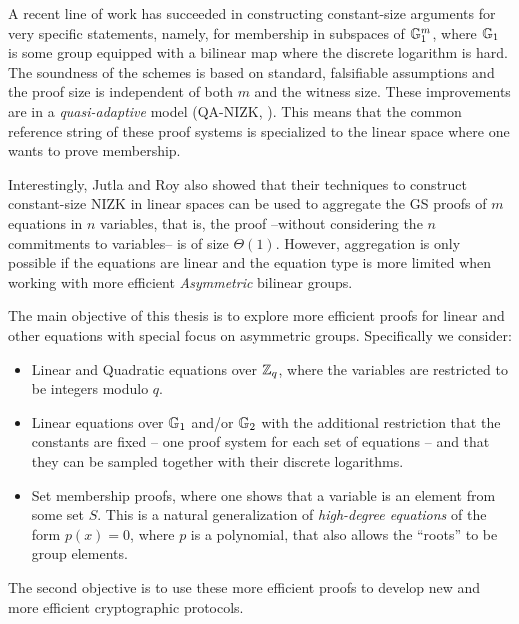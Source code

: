 A recent line of work 
  \cite{AC:JutRoy13,C:JutRoy14,EC:KilWee15,EC:LPJY14} 
has succeeded in constructing constant-size  
  arguments for very specific statements, namely, for membership in subspaces of $\mathbb{G}_1^{m}$, 
  where $\mathbb{G}_1$ is some group equipped with a bilinear map where the discrete logarithm is hard. 
The soundness of the schemes is based on standard, falsifiable assumptions 
  and the proof size is independent of both $m$ and the witness size.  These improvements are in a  \textit{quasi-adaptive} 
  model (QA-NIZK, \cite{AC:JutRoy13}).  This means that the common reference string of these proof systems is 
  specialized to the linear space where one wants to prove membership.
  
Interestingly, Jutla and Roy  \cite{C:JutRoy14} also showed that their techniques to construct 
  constant-size NIZK in linear spaces can be used to aggregate the GS proofs of $m$ equations in $n$ variables, that is, the proof --without considering the $n$ commitments to variables-- is of size $\Theta(1)$. However, aggregation is only possible if the equations are linear and the equation type is more limited when working with more efficient \emph{Asymmetric} bilinear groups. 

The main objective of this thesis is to explore more efficient proofs for linear and other equations with special focus on asymmetric groups. Specifically we consider:
\begin{itemize}
\item Linear and Quadratic equations over $\mathbb{Z}_q$, where the variables are restricted to be integers modulo $q$.
\item Linear equations over $\mathbb{G}_1$ and/or $\mathbb{G}_2$ with the additional restriction that the constants are fixed -- one proof system for each set of equations -- and that they 
can be sampled together with their discrete logarithms.
\item Set membership proofs, where one shows that a variable is an element from some set $S$. This is a natural generalization of \emph{high-degree equations} of the form $p(x)=0$, where $p$ is a polynomial, that also allows the ``roots'' to be group elements.
\end{itemize}
The second objective is to use these more efficient proofs to develop new and more efficient cryptographic protocols.
